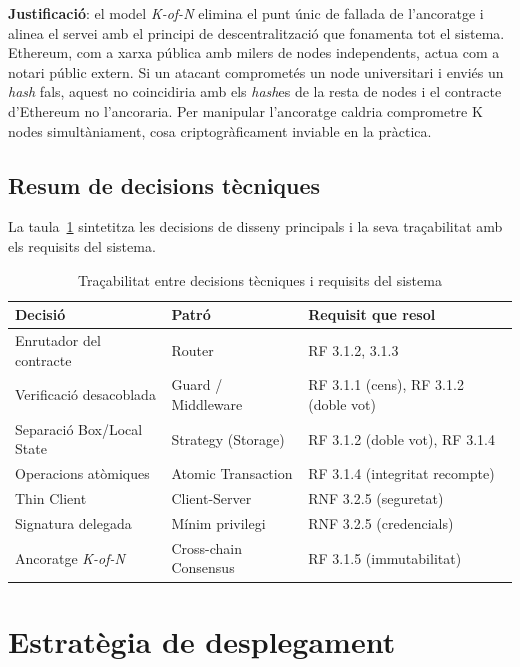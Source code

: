 \textbf{Justificació}: el model \textit{K-of-N} elimina el punt únic de fallada de l'ancoratge i alinea el servei amb el principi de descentralització que fonamenta tot el sistema. Ethereum, com a xarxa pública amb milers de nodes independents, actua com a notari públic extern. Si un atacant comprometés un node universitari i enviés un \textit{hash} fals, aquest no coincidiria amb els \textit{hash}es de la resta de nodes i el contracte d'Ethereum no l'ancoraria. Per manipular l'ancoratge caldria comprometre K nodes simultàniament, cosa criptogràficament inviable en la pràctica.
 
\subsection{Resum de decisions tècniques}
 
La taula~\ref{tab:decisions} sintetitza les decisions de disseny principals i la seva traçabilitat amb els requisits del sistema.
 
\begin{table}[H]
\centering
\small
\begin{tabularx}{\textwidth}{l l X}
\toprule
\textbf{Decisió} & \textbf{Patró} & \textbf{Requisit que resol} \\
\midrule
Enrutador del contracte & Router & RF 3.1.2, 3.1.3 \\
Verificació desacoblada & Guard / Middleware & RF 3.1.1 (cens), RF 3.1.2 (doble vot) \\
Separació Box/Local State & Strategy (Storage) & RF 3.1.2 (doble vot), RF 3.1.4 \\
Operacions atòmiques & Atomic Transaction & RF 3.1.4 (integritat recompte) \\
Thin Client & Client-Server & RNF 3.2.5 (seguretat) \\
Signatura delegada & Mínim privilegi & RNF 3.2.5 (credencials) \\
Ancoratge \textit{K-of-N} & Cross-chain Consensus & RF 3.1.5 (immutabilitat) \\
\bottomrule
\end{tabularx}
\caption{Traçabilitat entre decisions tècniques i requisits del sistema}
\label{tab:decisions}
\end{table}
 
 
\section{Estratègia de desplegament}
 
